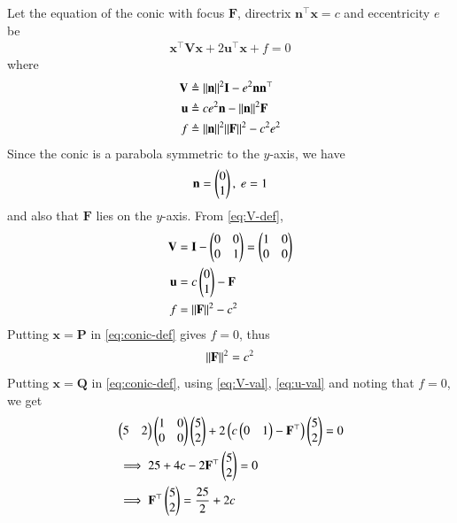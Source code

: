 \documentclass[journal,12pt,twocolumn]{IEEEtran}
\renewcommand{\vec}[1]{\boldsymbol{\mathbf{#1}}}
\begin{document}
\begin{enumerate}
    \solution Let the equation of the conic with focus $\vec{F}$, directrix
    $\vec{n}^\top\vec{x} = c$ and eccentricity $e$ be
    \begin{align}
        \vec{x}^\top\vec{V}\vec{x} + 2\vec{u}^\top\vec{x} + f = 0
        \label{eq:conic-def}
    \end{align}
    where
    \begin{align}
        \vec{V} &\triangleq \norm{\vec{n}}^2\vec{I} - e^2\vec{n}\vec{n}^\top \label{eq:V-def} \\
        \vec{u} &\triangleq ce^2\vec{n} - \norm{\vec{n}}^2\vec{F} \label{eq:u-def} \\
        f &\triangleq \norm{\vec{n}}^2\norm{\vec{F}}^2 - c^2e^2 \label{eq:f-def}
    \end{align}
    Since the conic is a parabola symmetric to the $y$-axis, we have
    \begin{align}
        \vec{n} = \myvec{0\\1},\ e = 1
    \end{align}
    and also that $\vec{F}$ lies on the $y$-axis. From \eqref{eq:V-def},
    \begin{align}
        \vec{V} &= \vec{I} - \myvec{0&0\\0&1} = \myvec{1&0\\0&0} \label{eq:V-val} \\
        \vec{u} &= c\myvec{0\\1} - \vec{F} \label{eq:u-val} \\
        f &= \norm{\vec{F}}^2 - c^2
    \end{align}
    Putting $\vec{x} = \vec{P}$ in \eqref{eq:conic-def} gives $f = 0$, thus 
    \begin{align}
        \norm{\vec{F}}^2 = c^2
        \label{eq:F-c}
    \end{align}
    Putting $\vec{x} = \vec{Q}$ in \eqref{eq:conic-def}, using \eqref{eq:V-val}, 
    \eqref{eq:u-val} and noting that $f = 0$, we get
    \begin{align}
        &\myvec{5&2}\myvec{1&0\\0&0}\myvec{5\\2} + 2\brak{c\myvec{0&1}-\vec{F}^\top}\myvec{5\\2} = 0 \\
        &\implies 25 + 4c - 2\vec{F}^\top\myvec{5\\2} = 0 \\
        &\implies \vec{F}^\top\myvec{5\\2} = \frac{25}{2} + 2c \label{eq:p1} \\

\end{align}
\end{enumerate}
\end{document}
